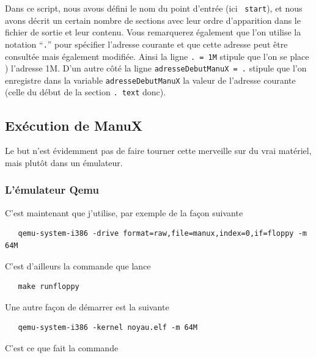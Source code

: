    Dans ce script, nous avous défini le nom du point d'entrée (ici {\tt
  start}), et nous avons décrit un certain nombre de sections avec
leur ordre d'apparition dans le fichier de sortie et leur
contenu. Vous remarquerez également que l'on utilise la notation
``{\tt .}'' pour spécifier l'adresse courante et que cette adresse
peut être consultée mais également modifiée. Ainsi la ligne {\tt . =
  1M} stipule que l'on se place ) l'adresse 1M. D'un autre côté la
ligne {\tt adresseDebutManuX = .} stipule que l'on enregistre dans la
variable {\tt adresseDebutManuX} la valeur de l'adresse courante
(celle du début de la section {\tt . text} donc).


%
\subsection{Exécution de ManuX}
\label{section:execution}

   Le but n'est évidemment pas de faire tourner cette merveille sur du
vrai matériel, mais plutôt dans un émulateur.

%
\subsubsection{L'émulateur Qemu}

   C'est maintenant \qemu \cite{qemu-website}  que j'utilise, par exemple de la façon
suivante
   
\begin{lstlisting}
   qemu-system-i386 -drive format=raw,file=manux,index=0,if=floppy -m 64M
\end{lstlisting}

  C'est d'ailleurs la commande que lance

\begin{lstlisting}
   make runfloppy
\end{lstlisting}

   Une autre façon de démarrer \manux est la suivante

\begin{lstlisting}
   qemu-system-i386 -kernel noyau.elf -m 64M
\end{lstlisting}

  C'est ce que fait la commande

